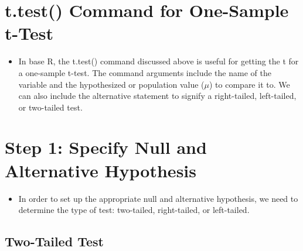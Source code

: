 \documentclass[
  letterpaper,
  DIV=11,
  numbers=noendperiod]{scrreprt}
\providecommand{\tightlist}{%
  \setlength{\itemsep}{0pt}\setlength{\parskip}{0pt}}\usepackage{longtable,booktabs,array}
\begin{document}
\section{t.test() Command for One-Sample
t-Test}\label{t.test-command-for-one-sample-t-test}

\begin{itemize}
\tightlist
\item
  In base R, the t.test() command discussed above is useful for getting
  the t for a one-sample t-test. The command arguments include the name
  of the variable and the hypothesized or population value (\(\mu\)) to
  compare it to. We can also include the alternative statement to
  signify a right-tailed, left-tailed, or two-tailed test.
\end{itemize}

\section{Step 1: Specify Null and Alternative
Hypothesis}\label{step-1-specify-null-and-alternative-hypothesis}

\begin{itemize}
\tightlist
\item
  In order to set up the appropriate null and alternative hypothesis, we
  need to determine the type of test: two-tailed, right-tailed, or
  left-tailed.
\end{itemize}

\subsection{Two-Tailed Test}\label{two-tailed-test}
\end{document}
